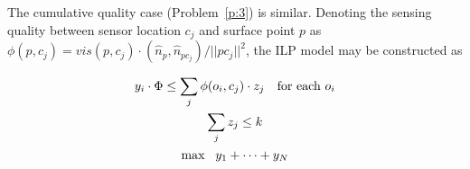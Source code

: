 
The cumulative quality case (Problem~\ref{p:3}) is similar. Denoting the sensing
quality between sensor location $c_j$ and surface point $p$ 
as $\phi(p, c_j) = vis(p, c_j) \cdot (
\hat{n}_p, \hat{n}_{p c_j} )/||p c_j||^2$, the ILP model may be constructed as

\begin{gather}
    y_i \cdot \Phi  \leq \sum_{j} \phi(o_i, c_j)\cdot z_j   \text{\quad for each }o_i\\
    \sum_j z_j \leq k\\
    \max\ \ y_1 + \dots + y_N
\end{gather}


